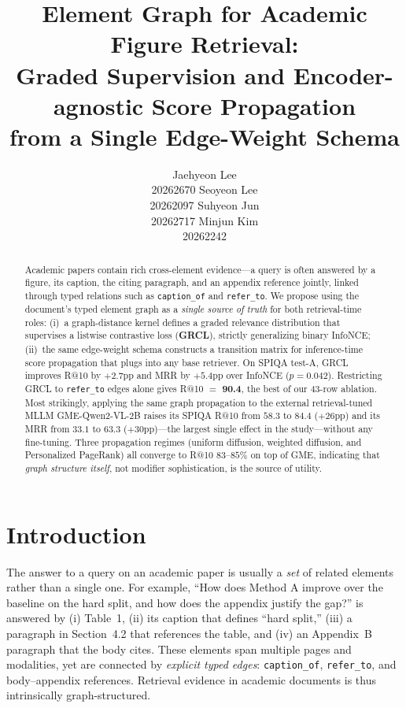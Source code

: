 \documentclass{article}
\title{Element Graph for Academic Figure Retrieval:\\
Graded Supervision and Encoder-agnostic Score Propagation\\
from a Single Edge-Weight Schema}
\author{%
  Jaehyeon Lee \\ 20262670
  \And
  Seoyeon Lee \\ 20262097
  \And
  Suhyeon Jun \\ 20262717
  \And
  Minjun Kim \\ 20262242
}
\begin{document}
\maketitle

\begin{abstract}
Academic papers contain rich cross-element evidence---a query is often answered
by a figure, its caption, the citing paragraph, and an appendix reference jointly,
linked through typed relations such as \texttt{caption\_of} and \texttt{refer\_to}.
We propose using the document's typed element graph as a \emph{single source of
truth} for both retrieval-time roles: (i)~a graph-distance kernel defines a
graded relevance distribution that supervises a listwise contrastive
loss (\textbf{GRCL}), strictly generalizing binary InfoNCE; (ii)~the same edge-weight
schema constructs a transition matrix for inference-time score propagation that
plugs into any base retriever. On SPIQA test-A, GRCL improves R@10 by $+2.7$pp
and MRR by $+5.4$pp over InfoNCE ($p\!=\!0.042$). Restricting GRCL to
\texttt{refer\_to} edges alone gives R@10 $=$ \textbf{90.4}, the best of our
43-row ablation. Most strikingly, applying the same graph propagation to the
external retrieval-tuned MLLM GME-Qwen2-VL-2B raises its SPIQA R@10 from $58.3$
to $\mathbf{84.4}$ ($+26$pp) and its MRR from $33.1$ to $\mathbf{63.3}$
($+30$pp)---the largest single effect in the study---without any fine-tuning.
Three propagation regimes (uniform diffusion, weighted diffusion, and Personalized
PageRank) all converge to R@10 $83$--$85\%$ on top of GME, indicating that
\emph{graph structure itself}, not modifier sophistication, is the source of
utility.
\end{abstract}

\section{Introduction}

The answer to a query on an academic paper is usually a \emph{set} of
related elements rather than a single one. For example,
``How does Method A improve over the baseline on the hard split, and how does
the appendix justify the gap?'' is answered by (i) Table~1, (ii) its caption
that defines ``hard split,'' (iii) a paragraph in Section~4.2 that references
the table, and (iv) an Appendix~B paragraph that the body cites. These
elements span multiple pages and modalities, yet are connected by
\emph{explicit typed edges}: \texttt{caption\_of}, \texttt{refer\_to}, and
body--appendix references. Retrieval evidence in academic documents is thus
intrinsically graph-structured.
\end{document}
